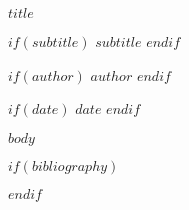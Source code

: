 \documentclass[10pt,a4paper,oneside]{book}
\begin{document}
\begin{titlepage}
\begin{flushright}

\vspace*{3cm}

{\fontsize{24}{30}\selectfont\bfseries\color{darkgray}$title$}

\vspace{1cm}

$if(subtitle)$
{\fontsize{16}{22}\selectfont\color{mediumgray}$subtitle$}
\vspace{1.5cm}
$endif$

$if(author)$
{\fontsize{14}{18}\selectfont\color{darkgray}$author$}
$endif$

\vfill

$if(date)$
{\color{lightgray}$date$}
$endif$

\end{flushright}
\end{titlepage}

\tableofcontents
\newpage

$body$

\newpage
{}
\theendnotes

$if(bibliography)$
\newpage
{}
\printbibliography[title=Bibliography]
$endif$
\end{document}

